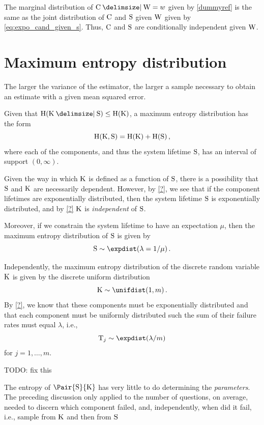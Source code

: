 \documentclass[
    11pt,
    extrafontsizes,
    article,
    oldfontcommands,
    final,
    oneside,
    openany,
    hidelinks]{memoir}
\begin{document}
The marginal distribution of $\rvcand \Given \RV{W} = w$ given by \cref{dummyref} is the same as the joint distribution of $\mathrm{C}$ and $\mathrm{S}$ given 
$\mathrm{W}$ given by \cref{eq:expo_cand_given_s}.
Thus, $\mathrm{C}$ and $\mathrm{S}$ are conditionally independent given $\mathrm{W}$.

\section{Maximum entropy distribution}
The larger the variance of the estimator, the larger a sample necessary to obtain an estimate with a given mean squared error.

Given that $\entropy(\RV{K} \Given \sv) \leq \entropy(\RV{K})$, a maximum entropy distribution has the form
\begin{equation}
\operatorname{H}(\mathrm{K}, \mathrm{S}) = \operatorname{H}(\mathrm{K}) + \operatorname{H}(\mathrm{S})\,,
\end{equation}
where each of the components, and thus the system lifetime $\mathrm{S}$, has an interval of support $(0,\infty)$.

Given the way in which $\mathrm{K}$ is defined as a function of $\mathrm{S}$, there is a possibility that $\mathrm{S}$ and $\mathrm{K}$ are necessarily dependent.
However, by \cref{?}, we see that if the component lifetimes are exponentially distributed, then the system lifetime $\mathrm{S}$ is exponentially distributed, and by \cref{?} $\mathrm{K}$ is \emph{independent} of $\mathrm{S}$.

Moreover, if we constrain the system lifetime to have an expectation $\mu$, then the maximum entropy distribution of $\mathrm{S}$ is given by
\begin{equation}
\sv \sim \expdist(\lambda = 1 / \mu)\,.
\end{equation}

Independently, the maximum entropy distribution of the discrete random variable $\mathrm{K}$ is given by the discrete uniform distribution
\begin{equation}
\RV{K} \sim \unifdist(1,m)\,.
\end{equation}
By \cref{?}, we know that these components must be exponentially distributed and that each component must be uniformly distributed such the sum of their failure rates must equal $\lambda$, i.e.,
\begin{equation}
\cv_j \sim \expdist(\lambda / m)
\end{equation}
for $j=1,\ldots,m$.

TODO: fix this

The entropy of $\Pair{\sv}{\RV{K}}$ has very little to do determining the \emph{parameters}. The preceding discussion only applied to the number of questions, on average, needed to discern which component failed, and, independently, when did it fail, i.e., sample from $\mathrm{K}$ and then from $\mathrm{S}$
\end{document}
